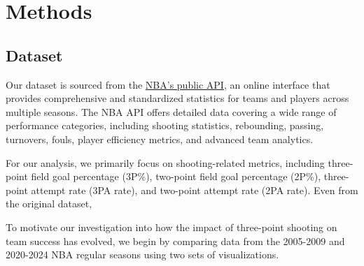 \documentclass[11pt, a4paper]{article} %
\begin{document}


\section{Methods}
\subsection{Dataset}
Our dataset is sourced from the \href{https://github.com/swar/nba_api}{NBA's public API}, an online interface that provides comprehensive 
and standardized statistics for teams and players across multiple seasons. The NBA API offers detailed 
data covering a wide range of performance categories, including shooting statistics, rebounding, passing, 
turnovers, fouls, player efficiency metrics, and advanced team analytics.

For our analysis, we primarily focus on shooting-related metrics, including three-point field goal percentage (3P\%), 
two-point field goal percentage (2P\%), three-point attempt rate (3PA rate), and two-point attempt rate (2PA rate). 
Even from the original dataset, 

To motivate our investigation into how the impact of three-point shooting on team success has evolved, 
we begin by comparing data from the 2005-2009 and 2020-2024 NBA regular seasons using two sets of visualizations.

\end{document}
